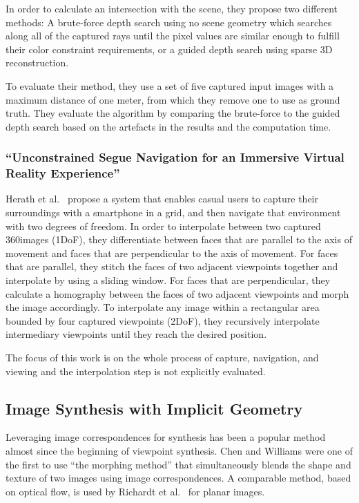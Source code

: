 In order to calculate an intersection with the scene, they propose two different methods: A brute-force depth search using no scene geometry which searches along all of the captured rays until the pixel values are similar enough to fulfill their color constraint requirements, or a guided depth search using sparse 3D reconstruction.

To evaluate their method, they use a set of five captured input images with a maximum distance of one meter, from which they remove one to use as ground truth. They evaluate the algorithm by comparing the brute-force to the guided depth search based on the artefacts in the results and the computation time.

\subsubsection{``Unconstrained Segue Navigation for an Immersive Virtual Reality Experience'' \cite{segue}}
Herath et al.\ \cite{segue} propose a system that enables casual users to capture their surroundings with a smartphone in a grid, and then navigate that environment with two degrees of freedom. In order to interpolate between two captured 360\degree images (1DoF), they differentiate between faces that are parallel to the axis of movement and faces that are perpendicular to the axis of movement. For faces that are parallel, they stitch the faces of two adjacent viewpoints together and interpolate by using a sliding window. For faces that are perpendicular, they calculate a homography between the faces of two adjacent viewpoints and morph the image accordingly. To interpolate any image within a rectangular area bounded by four captured viewpoints (2DoF), they recursively interpolate intermediary viewpoints until they reach the desired position.

The focus of this work is on the whole process of capture, navigation, and viewing and the interpolation step is not explicitly evaluated.

\subsection{Image Synthesis with Implicit Geometry}
Leveraging image correspondences for synthesis has been a popular method almost since the beginning of viewpoint synthesis. Chen and Williams \cite{apple} were one of the first to use ``the morphing method'' that simultaneously blends the shape and texture of two images using image correspondences. A comparable method, based on optical flow, is used by Richardt et al.\ \cite{megastereo} for planar images.

